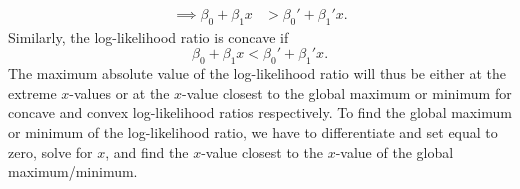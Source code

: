 {\begin{equation*}
\begin{split}
    \implies \beta_0 + \beta_1 x &> \beta_0' + \beta_1'x.
\end{split}{}
\end{equation*}
Similarly, the log-likelihood ratio is concave if 
\begin{equation*}
    \beta_0 + \beta_1 x < \beta_0' + \beta_1'x. 
\end{equation*}
The maximum absolute value of the log-likelihood ratio will thus be either at the extreme $x$-values or at the $x$-value closest to the global maximum or minimum for concave and convex log-likelihood ratios respectively.  To find the global maximum or minimum of the log-likelihood ratio, we have to differentiate and set equal to zero, solve for $x$, and find the $x$-value closest to the $x$-value of the global maximum/minimum. 
}

